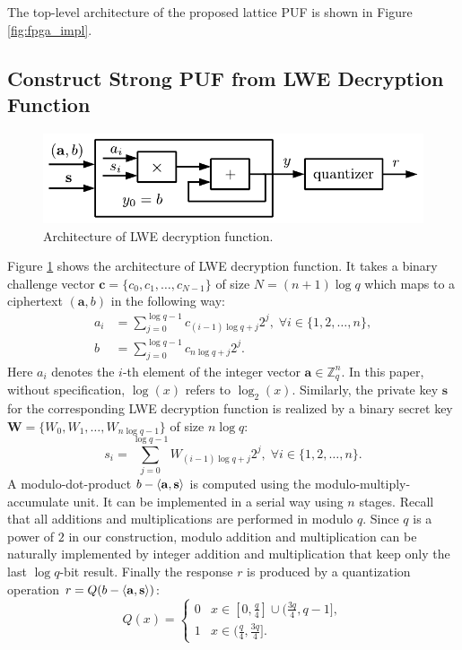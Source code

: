 The top-level architecture of the proposed lattice PUF is shown in Figure \ref{fig:fpga_impl}.



\subsection{Construct Strong PUF from LWE Decryption Function}
\label{sec:lwe_dec}
\begin{figure}[t!]
    \centering
    \includegraphics[width = 0.8\linewidth]{./figs/lwe_dec.pdf}
    \caption{Architecture of LWE decryption function.}
    \label{fig:lwedec}
\end{figure}

Figure \ref{fig:lwedec} shows the architecture of LWE decryption function. 
It takes a binary challenge vector $\mathbf{c} = \{c_0,c_1,\ldots,c_{N-1}\}$ of size $N = (n+1)\log q$ which maps to a ciphertext $(\mathbf{a},b)$ in the following way:
\begin{align*}
a_i &= \sum_{j=0}^{\log q-1}c_{(i-1)\log q+j}2^j,\; \forall i\in \{1,2,\ldots,n\}, \\
b &= \sum_{j=0}^{\log q-1}c_{n\log q+j}2^j. 
\end{align*}
Here $a_i$ denotes the $i$-th element of the integer vector $\mathbf{a}\in\mathbb{Z}_q^n$.
In this paper, without specification, $\log(x)$ refers to $\log_2(x)$.
Similarly, the private key $\mathbf{s}$ for the corresponding LWE decryption function is realized by a binary secret key $\mathbf{W} =\{W_0,W_1,\ldots,W_{n\log q-1}\} $ of size $n\log q$:
\begin{equation*}
s_i=\sum_{j=0}^{\log q-1} W_{(i-1)\log q+j} 2^j,\; \forall i\in \{1,2,\ldots,n\}.
\end{equation*}
A modulo-dot-product $b-\langle\mathbf{a},\mathbf{s}\rangle$ is computed using the modulo-multiply-accumulate unit. 
It can be implemented in a serial way using $n$ stages. 
Recall that all additions and multiplications are performed in modulo $q$.
Since $q$ is a power of $2$ in our construction, modulo addition and multiplication can be naturally implemented by integer addition and multiplication that keep only the last $\log q$-bit result. 
Finally the response $r$ is produced by a quantization operation $r = Q(b-\langle\mathbf{a},\mathbf{s}\rangle)$: 
\begin{equation*}
Q(x) = \begin{cases}
	0& x \in [0,\frac{q}{4}]\cup(\frac{3q}{4},q-1],\\
	1& x \in (\frac{q}{4},\frac{3q}{4}].
\end{cases}
\end{equation*}

